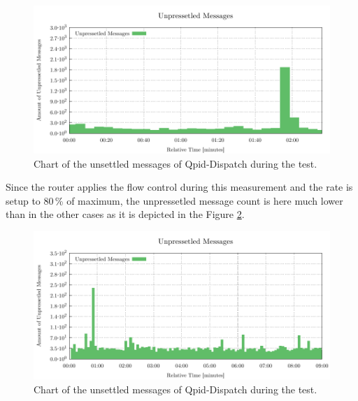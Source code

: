 \begin{figure}[H]
	\centering
	\includegraphics[width=1\linewidth]{obrazky-figures/charts/singlepoint-router-latency-routerLink.pdf}
	\caption{Chart of the unsettled messages of Qpid-Dispatch during the test.}
	\label{fig:latency-router-routerLink}
\end{figure}

Since the router applies the flow control during this measurement and the rate is setup to 80\,\% of maximum, the unpressetled message count is here much lower than in the other cases as it is depicted in the Figure \ref{fig:latency-multiple-router-routerLink}.

\begin{figure}[H]
	\centering
	\includegraphics[width=1\linewidth]{obrazky-figures/charts/multipoint-router-only-latency-routerLink.pdf}
	\caption{Chart of the unsettled messages of Qpid-Dispatch during the test.}
	\label{fig:latency-multiple-router-routerLink}
\end{figure}

